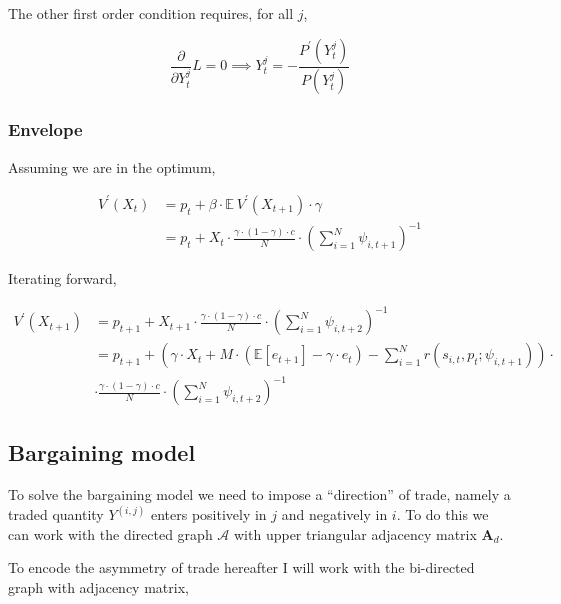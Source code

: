 \documentclass[american]{scrartcl}
\newcommand{\E}{\mathbb{E}}
\newcommand{\matr}[1]{\bm{#1}}
\begin{document}
The other first order condition requires, for all $j$,

\begin{equation}
	\frac{\partial}{\partial Y^j_t} L = 0 \implies Y^j_t = - \frac{P^\prime(Y^j_t)}{ P(Y^j_t)}
\end{equation}

\subsubsection{Envelope}

Assuming we are in the optimum,

\begin{equation}
	\begin{split}
		V^\prime(X_t) &= p_t + \beta \cdot \E \ V^\prime(X_{t+1}) \cdot \gamma \\
		&= p_t + X_t \cdot \frac{\gamma \cdot  (1-\gamma) \cdot c}{N}\cdot \left(\sum^N_{i = 1} \psi_{i, t+1} \right)^{-1}
	\end{split}
\end{equation}

Iterating forward,

\begin{equation}
	\begin{split}
		V^\prime(X_{t+1}) &= p_{t+1} + X_{t+1} \cdot \frac{\gamma \cdot  (1-\gamma) \cdot c}{N}\cdot \left(\sum^N_{i = 1} \psi_{i, t+2} \right)^{-1} \\
		&= p_{t+1} + \left( \gamma \cdot X_t + M \cdot \left( \E[e_{t+1}] - \gamma \cdot e_t \right) - \sum^N_{i = 1}  r(s_{i, t}, p_{t}; \psi_{i, t+1}) \right) \cdot \\
		&\cdot \frac{\gamma \cdot  (1-\gamma) \cdot c}{N}\cdot \left(\sum^N_{i = 1} \psi_{i, t+2} \right)^{-1}
	\end{split}
\end{equation}



\newpage

\subsection{Bargaining model}

To solve the bargaining model we need to impose a ``direction'' of trade, namely a traded quantity $Y^{(i, j)}$ enters positively in $j$ and negatively in $i$. To do this we can work with the directed graph $\mathcal{A}$ with upper triangular adjacency matrix $\matr{A}_{d}$.

To encode the asymmetry of trade hereafter I will work with the bi-directed graph with adjacency matrix,
\end{document}
